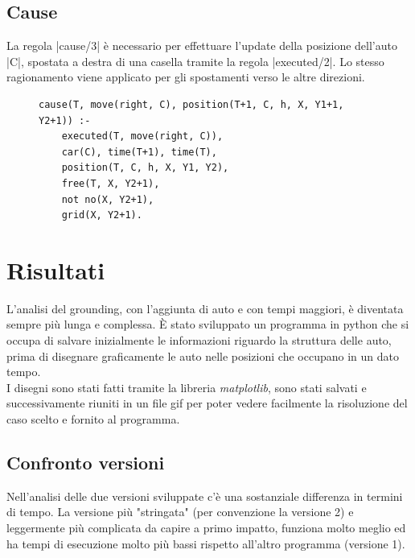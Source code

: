 \documentclass[10pt, a4paper, oneside]{article}
\begin{document}
\subsection{Cause}
La regola |cause/3| è necessario per effettuare l'update della posizione dell'auto |C|, spostata a destra di una casella tramite la regola |executed/2|. Lo stesso ragionamento viene applicato per gli spostamenti verso le altre direzioni.

\begin{figure}[H]
\centering
\begin{verbatim}
cause(T, move(right, C), position(T+1, C, h, X, Y1+1, Y2+1)) :-
    executed(T, move(right, C)),
    car(C), time(T+1), time(T),
    position(T, C, h, X, Y1, Y2),
    free(T, X, Y2+1),
    not no(X, Y2+1),
    grid(X, Y2+1).
\end{verbatim}
\end{figure}















\newpage
\section{Risultati}
L'analisi del grounding, con l'aggiunta di auto e con tempi maggiori, è diventata sempre più lunga e complessa. È stato sviluppato un programma in python che si occupa di salvare inizialmente le informazioni riguardo la struttura delle auto, prima di disegnare graficamente le auto nelle posizioni che occupano in un dato tempo. \\

\noindent
I disegni sono stati fatti tramite la libreria \emph{matplotlib}, sono stati salvati e successivamente riuniti in un file gif per poter vedere facilmente la risoluzione del caso scelto e fornito al programma. \\


\subsection{Confronto versioni}
Nell'analisi delle due versioni sviluppate c'è una sostanziale differenza in termini di tempo. La versione più "stringata" (per convenzione la versione 2) e leggermente più complicata da capire a primo impatto, funziona molto meglio ed ha tempi di esecuzione molto più bassi rispetto all'altro programma (versione 1). %
\end{document}

